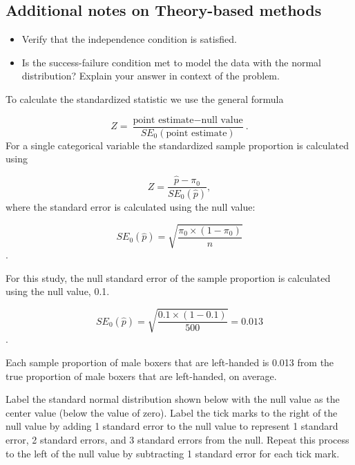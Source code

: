 \documentclass[
]{report}
\providecommand{\tightlist}{%
  \setlength{\itemsep}{0pt}\setlength{\parskip}{0pt}}
\begin{document}
\subsection*{Additional notes on Theory-based methods}\label{additional-notes-on-theory-based-methods}

\vspace{2in}

\begin{itemize}
\tightlist
\item
  Verify that the independence condition is satisfied.
\end{itemize}

\vspace{0.5in}

\begin{itemize}
\tightlist
\item
  Is the success-failure condition met to model the data with the normal distribution? Explain your answer in context of the problem.
\end{itemize}

\vspace{0.8in}

To calculate the standardized statistic we use the general formula

\[
Z = \frac{\text{point estimate} - \text{null value}}{SE_0(\text{point estimate})}.
\]
For a single categorical variable the standardized sample proportion is calculated using

\[
Z = \frac{\hat{p} - \pi_0}{SE_0(\hat{p})},
\]
where the standard error is calculated using the null value:

\[SE_0(\hat{p})=\sqrt{\frac{\pi_0\times(1-\pi_0)}{n}}\].

For this study, the null standard error of the sample proportion is calculated using the null value, 0.1.

\[SE_0(\hat{p})=\sqrt{\frac{0.1\times(1-0.1)}{500}} = 0.013\].

Each sample proportion of male boxers that are left-handed is 0.013 from the true proportion of male boxers that are left-handed, on average.

\newpage

Label the standard normal distribution shown below with the null value as the center value (below the value of zero). Label the tick marks to the right of the null value by adding 1 standard error to the null value to represent 1 standard error, 2 standard errors, and 3 standard errors from the null. Repeat this process to the left of the null value by subtracting 1 standard error for each tick mark.
\end{document}
